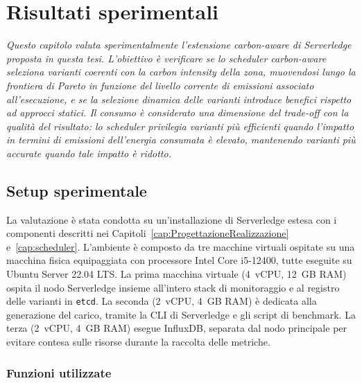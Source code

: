 \chapter{Risultati sperimentali}
\label{cap:RisultatiSperimentali}

\emph{Questo capitolo valuta sperimentalmente l'estensione carbon-aware
di Serverledge proposta in questa tesi. L'obiettivo è verificare se lo
scheduler carbon-aware seleziona varianti coerenti con la carbon intensity
della zona, muovendosi lungo la frontiera di Pareto in funzione del
livello corrente di emissioni associato all'esecuzione, e se la selezione dinamica delle
varianti introduce benefici rispetto ad approcci statici. Il consumo
è considerato una dimensione del trade-off con la qualità del risultato:
lo scheduler privilegia varianti più efficienti quando l'impatto in termini
di emissioni dell'energia consumata è elevato, mantenendo varianti più
accurate quando tale impatto è ridotto.}

\section{Setup sperimentale}
\label{sec:setup-sperimentale}

La valutazione è stata condotta su un'installazione di Serverledge estesa
con i componenti descritti nei Capitoli~\ref{cap:ProgettazioneRealizzazione}
e~\ref{cap:scheduler}. L'ambiente è composto da tre macchine virtuali
ospitate su una macchina fisica equipaggiata con processore Intel Core
i5-12400, tutte eseguite su Ubuntu Server 22.04 LTS. La prima macchina
virtuale (4~vCPU, 12~GB RAM) ospita il nodo Serverledge insieme all'intero
stack di monitoraggio e al registro delle varianti in \texttt{etcd}. La
seconda (2~vCPU, 4~GB RAM) è dedicata alla generazione del carico, tramite
la CLI di Serverledge e gli script di benchmark. La terza (2~vCPU, 4~GB RAM)
esegue InfluxDB, separata dal nodo principale per evitare contesa sulle
risorse durante la raccolta delle metriche.

\subsection{Funzioni utilizzate}
\label{subsec:funzioni-utilizzate}

